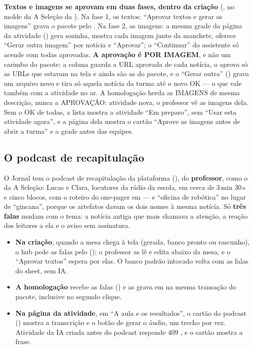 \textbf{Textos e imagens se aprovam em duas fases, dentro da criação}
(, no molde da A Seleção da ). Na fase 1, os
textos: \enquote{Aprovar textos e gerar as imagens} grava o pacote pelo
. Na fase 2, as imagens: a mesma grade da página da
atividade () gera sozinha, mostra cada
imagem junto da manchete, oferece \enquote{Gerar outra imagem} por notícia e
\enquote{Aprovar}; o \enquote{Continuar} do assistente só acende com todas
aprovadas. \textbf{A aprovação é POR IMAGEM}, e não um carimbo do pacote: a
coluna  guarda a URL aprovada de cada notícia, o
 aprova só as URLs que estavam na
tela e ainda são as do pacote, e o \enquote{Gerar outra}
() grava um arquivo novo
e tira só aquela notícia da turma até o novo OK --- o que vale também com a
atividade no ar. A homologação herda as IMAGENS de mesma descrição, nunca a
APROVAÇÃO: atividade nova, o professor vê as imagens dela. Sem o OK de todas, a
lista mostra a atividade \enquote{Em preparo}, sem \enquote{Usar esta
atividade agora}, e a página dela mostra o cartão \enquote{Aprove as imagens
antes de abrir a turma} e a grade antes das equipes.

\subsection{O podcast de recapitulação}

O Jornal tem o podcast de recapitulação da plataforma (), do
\textbf{professor}, como o da A Seleção: Lucas e Clara, locutores da rádio da
escola, em cerca de 3\,min 30\,s e cinco blocos, com o roteiro do one-pager em
 --- e \enquote{oficina de robótica} no lugar
de \enquote{gincana}, porque os artefatos davam os dois nomes à mesma notícia.
Só \textbf{três falas} mudam com o tema: a notícia antiga que mais chamava a
atenção, a reação dos leitores a ela e o aviso sem assinatura.

\begin{itemize}
  \item \textbf{Na criação}, quando a mesa chega à tela (gerada, banco pronto
    ou rascunho), o hub pede as falas pelo 
    (); o professor as lê e
    edita abaixo da mesa, e o \enquote{Aprovar textos} espera por elas. O banco
    padrão intocado volta com as falas do sheet, sem IA.
  \item \textbf{A homologação} recebe as falas ()
    e as grava em  na mesma transação do pacote,
    inclusive no segundo clique.
  \item \textbf{Na página da atividade}, em \enquote{A aula e os resultados}, o
    cartão do podcast () mostra a
    transcrição e o botão de gerar o áudio, um trecho por vez. Atividade da IA
    criada antes do podcast responde 409 , e o cartão
    mostra a frase.
\end{itemize}

